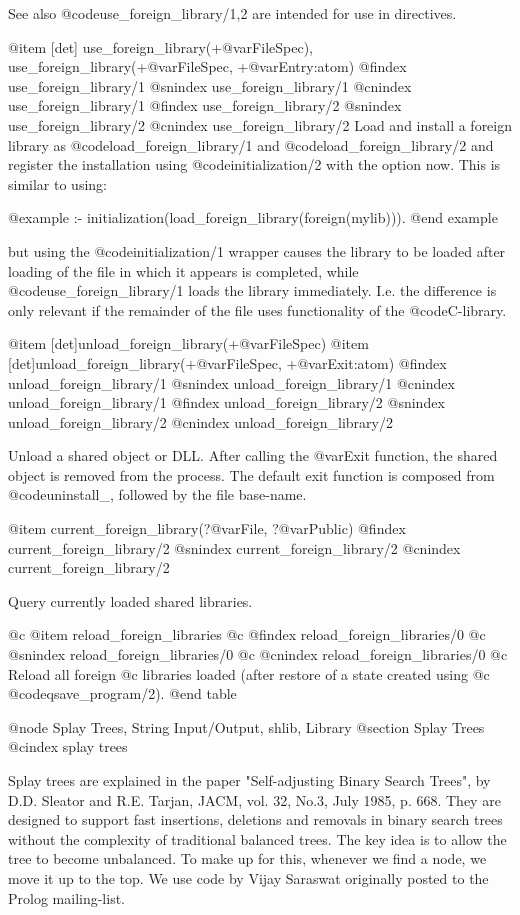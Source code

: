     See also
        @code{use_foreign_library/1,2} are intended for use in
        directives. 

@item [det] use_foreign_library(+@var{FileSpec}),  use_foreign_library(+@var{FileSpec}, +@var{Entry}:atom)
@findex use_foreign_library/1
@snindex use_foreign_library/1
@cnindex use_foreign_library/1
@findex use_foreign_library/2
@snindex use_foreign_library/2
@cnindex use_foreign_library/2
    Load and install a foreign library as @code{load_foreign_library/1}
    and @code{load_foreign_library/2} and
    register the installation using @code{initialization/2} with the option
    now. This is similar to using:

@example
    :- initialization(load_foreign_library(foreign(mylib))).
@end example

    but using the @code{initialization/1} wrapper causes the library to
    be loaded after loading of the file in which it appears is
    completed, while @code{use_foreign_library/1} loads the library
    immediately. I.e. the difference is only relevant if the remainder
    of the file uses functionality of the @code{C}-library. 

@item [det]unload_foreign_library(+@var{FileSpec})
@item [det]unload_foreign_library(+@var{FileSpec}, +@var{Exit}:atom) 
@findex unload_foreign_library/1
@snindex unload_foreign_library/1
@cnindex unload_foreign_library/1
@findex unload_foreign_library/2
@snindex unload_foreign_library/2
@cnindex unload_foreign_library/2

Unload a shared
object or DLL. After calling the @var{Exit} function, the shared object is
removed from the process. The default exit function is composed from
@code{uninstall_}, followed by the file base-name.

@item current_foreign_library(?@var{File}, ?@var{Public}) 
@findex current_foreign_library/2
@snindex current_foreign_library/2
@cnindex current_foreign_library/2

Query currently
loaded shared libraries.  

@c @item reload_foreign_libraries 
@c @findex reload_foreign_libraries/0
@c @snindex reload_foreign_libraries/0
@c @cnindex reload_foreign_libraries/0
@c Reload all foreign
@c libraries loaded (after restore of a state created using
@c @code{qsave_program/2}).
@end table

@node Splay Trees, String Input/Output, shlib, Library
@section Splay Trees
@cindex splay trees

Splay trees are explained in the paper "Self-adjusting Binary Search
Trees", by D.D. Sleator and R.E. Tarjan, JACM, vol. 32, No.3, July 1985,
p. 668. They are designed to support fast insertions, deletions and
removals in binary search trees without the complexity of traditional
balanced trees. The key idea is to allow the tree to become
unbalanced. To make up for this, whenever we find a node, we move it up
to the top. We use code by Vijay Saraswat originally posted to the Prolog
mailing-list.

